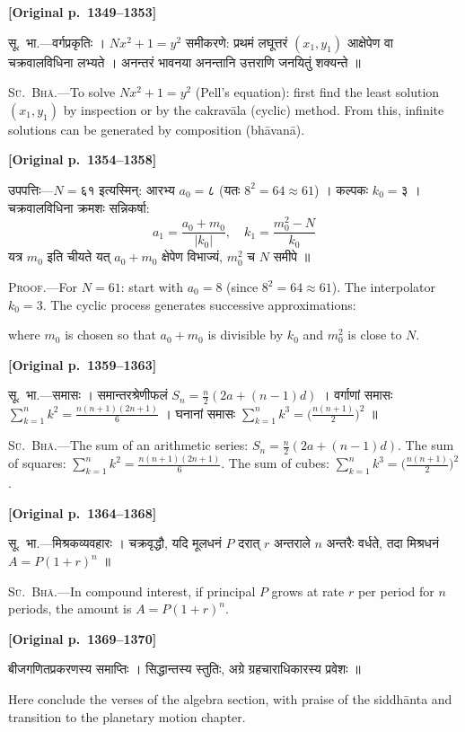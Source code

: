 \documentclass[11pt,a4paper]{article}
\newcommand{\dev}[1]{{\devanagarifont\mdseries\upshape #1}}
\newcommand{\pagelabel}[1]{\textcolor{sectioncolor}{\textbf{[Original p.~#1]}}}
\newcommand{\bilingualpair}[2]{%
  \noindent%
  \begin{minipage}[t]{0.47\textwidth}
    \begin{flushleft}
      \small\dev{#1}
    \end{flushleft}
  \end{minipage}%
  \hfill\vrule\hfill%
  \begin{minipage}[t]{0.47\textwidth}
    \begin{flushleft}
      \small #2
    \end{flushleft}
  \end{minipage}%
  \par\vspace{1.2ex}
}
\newcommand{\mathblock}[1]{%
  \par\vspace{0.8ex}
  \noindent\makebox[\textwidth]{#1}%
  \par\vspace{0.8ex}
}
\begin{document}
\vspace{0.5ex}
\pagelabel{1349--1353}

\bilingualpair{%
सू.~भा.---वर्गप्रकृतिः । $Nx^2 + 1 = y^2$ समीकरणे: प्रथमं लघूत्तरं $(x_1, y_1)$ आक्षेपेण वा चक्रवालविधिना लभ्यते । अनन्तरं भावनया अनन्तानि उत्तराणि जनयितुं शक्यन्ते ॥
}{%
\textsc{Sū.~Bhā.}---To solve $Nx^2 + 1 = y^2$ (Pell's equation): first find the least solution $(x_1, y_1)$ by inspection or by the cakravāla (cyclic) method. From this, infinite solutions can be generated by composition (bhāvanā).
}

\vspace{0.5ex}
\pagelabel{1354--1358}

\bilingualpair{%
उपपत्तिः---$N = ६१$ इत्यस्मिन्: आरभ्य $a_0 = ८$ (यतः $8^2 = 64 \approx 61$) । कल्पकः $k_0 = ३$ । चक्रवालविधिना क्रमशः सन्निकर्षा:
$$a_1 = \frac{a_0 + m_0}{|k_0|}, \quad k_1 = \frac{m_0^2 - N}{k_0}$$
यत्र $m_0$ इति चीयते यत् $a_0 + m_0$ क्षेपेण विभाज्यं, $m_0^2$ च $N$ समीपे ॥
}{%
\textsc{Proof.}---For $N = 61$: start with $a_0 = 8$ (since $8^2 = 64 \approx 61$). The interpolator $k_0 = 3$. The cyclic process generates successive approximations:
\mathblock{$\displaystyle a_1 = \frac{a_0 + m_0}{|k_0|}, \quad k_1 = \frac{m_0^2 - N}{k_0}$}
where $m_0$ is chosen so that $a_0 + m_0$ is divisible by $k_0$ and $m_0^2$ is close to $N$.
}

\vspace{0.5ex}
\pagelabel{1359--1363}

\bilingualpair{%
सू.~भा.---समासः । समान्तरश्रेणीफलं $S_n = \frac{n}{2}(2a + (n-1)d)$ । वर्गाणां समासः $\sum_{k=1}^{n} k^2 = \frac{n(n+1)(2n+1)}{6}$ । घनानां समासः $\sum_{k=1}^{n} k^3 = \bigl(\frac{n(n+1)}{2}\bigr)^2$ ॥
}{%
\textsc{Sū.~Bhā.}---The sum of an arithmetic series: $S_n = \frac{n}{2}(2a + (n-1)d)$. The sum of squares: $\sum_{k=1}^{n} k^2 = \frac{n(n+1)(2n+1)}{6}$. The sum of cubes: $\sum_{k=1}^{n} k^3 = \bigl(\frac{n(n+1)}{2}\bigr)^2$.
}

\vspace{0.5ex}
\pagelabel{1364--1368}

\bilingualpair{%
सू.~भा.---मिश्रकव्यवहारः । चक्रवृद्धौ, यदि मूलधनं $P$ दरात् $r$ अन्तराले $n$ अन्तरैः वर्धते, तदा मिश्रधनं $A = P(1 + r)^n$ ॥
}{%
\textsc{Sū.~Bhā.}---In compound interest, if principal $P$ grows at rate $r$ per period for $n$ periods, the amount is $A = P(1 + r)^n$.
}

\vspace{0.5ex}
\pagelabel{1369--1370}

\bilingualpair{%
बीजगणितप्रकरणस्य समाप्तिः । सिद्धान्तस्य स्तुतिः, अग्रे ग्रहचाराधिकारस्य प्रवेशः ॥
}{%
Here conclude the verses of the algebra section, with praise of the siddhānta and transition to the planetary motion chapter.
}
\end{document}
